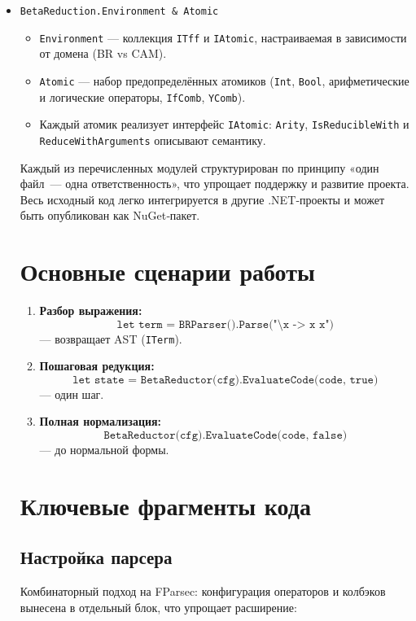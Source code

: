 \begin{itemize}
  \item \texttt{BetaReduction.Environment \& Atomic}  
    \begin{itemize}
      \item \texttt{Environment} — коллекция \texttt{ITff} и \texttt{IAtomic}, настраиваемая в зависимости от домена (BR vs CAM).  
      \item \texttt{Atomic} — набор предопределённых атомиков (\texttt{Int}, \texttt{Bool}, арифметические и логические операторы, \texttt{IfComb}, \texttt{YComb}).  
      \item Каждый атомик реализует интерфейс \texttt{IAtomic}:  
        \texttt{Arity}, \texttt{IsReducibleWith} и \texttt{ReduceWithArguments} описывают семантику.
    \end{itemize}


\noindent
Каждый из перечисленных модулей структурирован по принципу «один файл — одна ответственность», что упрощает поддержку и развитие проекта. Весь исходный код легко интегрируется в другие .NET‑проекты и может быть опубликован как NuGet‑пакет.


\section{Основные сценарии работы}
\begin{enumerate}
  \item \textbf{Разбор выражения:} 
    \[
      \texttt{let term = BRParser().Parse("\textbackslash x -> x x")}
    \]
    — возвращает AST (\texttt{ITerm}).
  \item \textbf{Пошаговая редукция:} 
    \[
      \texttt{let state = BetaReductor(cfg).EvaluateCode(code, true)}
    \]
    — один шаг.
  \item \textbf{Полная нормализация:} 
    \[
      \texttt{BetaReductor(cfg).EvaluateCode(code, false)}
    \]
    — до нормальной формы.
\end{enumerate}

\section{Ключевые фрагменты кода}

\subsection{Настройка парсера}
Комбинаторный подход на FParsec: конфигурация операторов и колбэков вынесена в отдельный блок, что упрощает расширение:


\end{itemize}
